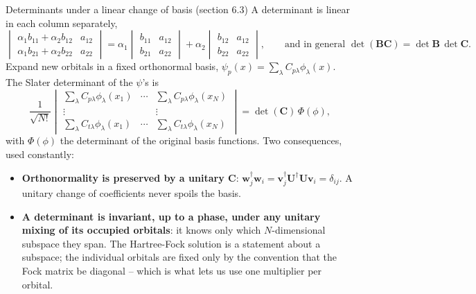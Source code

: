 \documentclass[aspectratio=169,10pt]{beamer}
\begin{document}
\begin{frame}{Determinants under a linear change of basis (section 6.3)}
  \small
  A determinant is linear in each column separately,
  \[
    \begin{vmatrix}\alpha_1b_{11}+\alpha_2b_{12} & a_{12}\\ \alpha_1b_{21}+\alpha_2b_{22} & a_{22}\end{vmatrix}
    =\alpha_1\begin{vmatrix}b_{11} & a_{12}\\ b_{21} & a_{22}\end{vmatrix}+\alpha_2\begin{vmatrix}b_{12} & a_{12}\\ b_{22} & a_{22}\end{vmatrix},
    \qquad\text{and in general }\det(\bm{B}\bm{C})=\det\bm{B}\,\det\bm{C}.
  \]
  Expand new orbitals in a fixed orthonormal basis, $\psi_p(x)=\sum_\lambda C_{p\lambda}\phi_\lambda(x)$. The Slater determinant of the $\psi$'s is
  \[
    \frac{1}{\sqrt{N!}}
    \begin{vmatrix}
      \sum_\lambda C_{p\lambda}\phi_\lambda(x_1) & \cdots & \sum_\lambda C_{p\lambda}\phi_\lambda(x_N)\\
      \vdots & & \vdots\\
      \sum_\lambda C_{t\lambda}\phi_\lambda(x_1) & \cdots & \sum_\lambda C_{t\lambda}\phi_\lambda(x_N)
    \end{vmatrix}
    =\det(\bm{C})\,\Phi(\phi),
  \]
  with $\Phi(\phi)$ the determinant of the original basis functions. Two consequences, used constantly:
  \begin{itemize}
    \item \textbf{Orthonormality is preserved by a unitary $\bm{C}$}: $\bm{w}_j^{\dagger}\bm{w}_i=\bm{v}_j^{\dagger}\bm{U}^{\dagger}\bm{U}\bm{v}_i=\delta_{ij}$. A unitary change of coefficients never spoils the basis.
    \item \textbf{A determinant is invariant, up to a phase, under any unitary mixing of its occupied orbitals}: it knows only which $N$-dimensional subspace they span. The Hartree-Fock solution is a statement about a \alert{subspace}; the individual orbitals are fixed only by the convention that the Fock matrix be diagonal -- which is what lets us use one multiplier per orbital.
  \end{itemize}
\end{frame}
\end{document}
